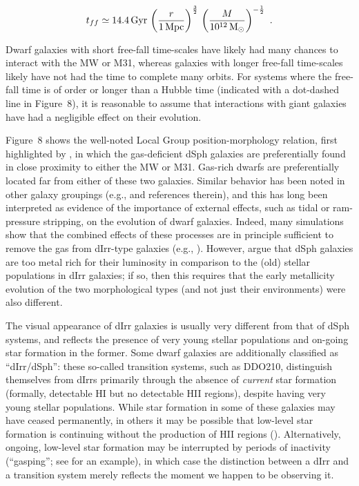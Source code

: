 \documentclass[manuscript]{aastex}
\begin{document}
\begin{equation}
t_{ff} \simeq 14.4\,{\rm Gyr}\,\left(\frac{r}{1\,{\rm Mpc}}\right)^{\frac{3}{2}}\,\left(\frac{M}{10^{12}\,{\rm M_\odot}}\right)^{-\frac{1}{2}}~.
\end{equation}

\noindent Dwarf galaxies with short free-fall time-scales have likely
had many chances to interact with the MW or M31, whereas galaxies with
longer free-fall time-scales likely have not had the time to complete
many orbits. For systems where the free-fall time is of order or
longer than a Hubble time (indicated with a dot-dashed line in
Figure~8), it is reasonable to assume that interactions with giant
galaxies have had a negligible effect on their evolution.

Figure~8 shows the well-noted Local Group position-morphology
relation, first highlighted by \cite{einasto1974}, in which the
gas-deficient dSph galaxies are preferentially found in close
proximity to either the MW or M31. Gas-rich dwarfs are preferentially
located far from either of these two galaxies. Similar behavior has
been noted in other galaxy groupings (e.g.,
\citealt{skillman2003a,geha2006b,bouchard2009} and references therein),
and this has long been interpreted as evidence of the importance of
external effects, such as tidal or ram-pressure stripping, on the
evolution of dwarf galaxies. Indeed, many simulations show that the
combined effects of these processes are in principle sufficient to
remove the gas from dIrr-type galaxies
(e.g., \citealt{mayer2006}). However, \cite{grebel2003} argue that dSph
galaxies are too metal rich for their luminosity in comparison to the
(old) stellar populations in dIrr galaxies; if so, then this requires
that the early metallicity evolution of the two morphological types
(and not just their environments) were also different.

The visual appearance of dIrr galaxies is usually very different from
that of dSph systems, and reflects the presence of very young stellar
populations and on-going star formation in the former. Some dwarf
galaxies are additionally classified as ``dIrr/dSph'': these so-called
transition systems, such as DDO210, distinguish themselves from dIrrs
primarily through the absence of {\it current} star formation
(formally, detectable HI but no detectable HII regions), despite
having very young stellar populations. While star formation in some of
these galaxies may have ceased permanently, in others it may be
possible that low-level star formation is continuing without the
production of HII regions (\citealt{fumigalli2011}). Alternatively,
ongoing, low-level star formation may be interrupted by periods of inactivity
(``gasping''; see \cite{tosi1991} for an example), in which case the
distinction between a dIrr and a transition system merely reflects the
moment we happen to be observing it.
\end{document}
